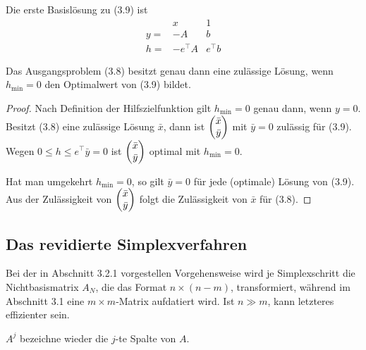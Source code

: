 Die erste Basislösung zu (3.9) ist
\begin{equation}
  \begin{array}{r|cc}
    & x & 1 \\
    \hline
    y = & -A & b \\
    h = & -e^\top A & e^\top b
  \end{array}
\end{equation}

\begin{thm}
  Das Ausgangsproblem (3.8) besitzt genau dann eine zulässige Lösung, wenn
  $h_{\min} = 0$ den Optimalwert von (3.9) bildet.
\end{thm}

\begin{proof}
  Nach Definition der Hilfszielfunktion gilt $h_{\min} = 0$ genau dann, wenn
  $y=0$. Besitzt (3.8) eine zulässige Lösung $\bar{x}$, dann ist $\begin{pmatrix}\bar{x}
    \\ \bar{y}\end{pmatrix}$ mit $\bar{y} = 0$ zulässig für (3.9). Wegen $0 \le h \le e^\top
  \bar{y} = 0$ ist $\begin{pmatrix}\bar{x} \\ \bar{y}\end{pmatrix}$ optimal mit $h_{\min} = 0$.

  Hat man umgekehrt $h_{\min} = 0$,  so gilt $\bar{y} = 0$ für jede (optimale)
  Lösung von (3.9). Aus der Zulässigkeit von $\begin{pmatrix}\bar{x} \\ \bar{y}\end{pmatrix}$ folgt
  die Zulässigkeit von $\bar{x}$ für (3.8).
\end{proof}

\subsection{Das revidierte Simplexverfahren}
Bei der in Abschnitt 3.2.1 vorgestellen Vorgehensweise wird je Simplexschritt
die Nichtbasismatrix $A_N$, die das Format $n \times (n-m)$, transformiert,
während im Abschnitt 3.1 eine $m \times m$-Matrix aufdatiert wird. Ist $n \gg
m$, kann letzteres effizienter sein.

$A^j$ bezeichne wieder die $j$-te Spalte von $A$.

